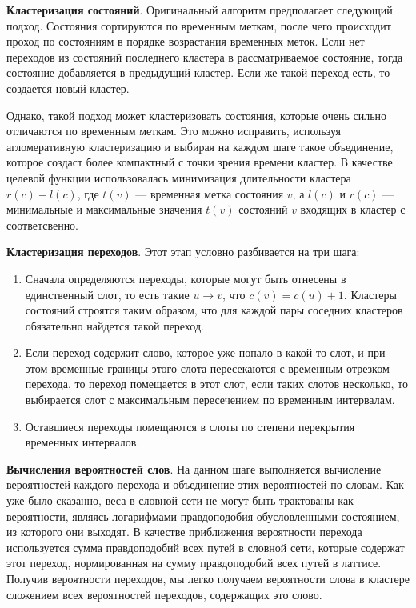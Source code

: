 \textbf{Кластеризация состояний}. Оригинальный алгоритм предполагает следующий подход. Состояния сортируются по временным меткам, после чего происходит проход по состояниям в порядке возрастания временных меток. Если нет переходов из состояний последнего кластера в рассматриваемое состояние, тогда состояние добавляется в предыдущий кластер. Если же такой переход есть, то создается новый кластер.

Однако, такой подход может кластеризовать состояния, которые очень сильно отличаются по временным меткам. Это можно исправить, используя агломеративную кластеризацию и выбирая на каждом шаге такое объединение, которое создаст более компактный с точки зрения времени кластер. В качестве целевой функции использовалась минимизация длительности кластера $r(c)-l(c)$, где $t(v)$ --- временная метка состояния $v$, а $l(c)$ и $r(c)$ --- минимальные и максимальные значения $t(v)$ состояний $v$ входящих в кластер $с$ соответсвенно.

\textbf{Кластеризация переходов}. Этот этап условно разбивается на три шага:

\begin{enumerate}
 \item Сначала определяются переходы, которые могут быть отнесены в единственный слот, то есть такие $u \rightarrow v$, что $ c(v)=c(u)+1$. Кластеры состояний строятся таким образом, что для каждой пары соседних кластеров обязательно найдется такой переход.
 \item Если переход содержит слово, которое уже попало в какой-то слот, и при этом временные границы этого слота пересекаются с временным отрезком перехода, то переход помещается в этот слот, если таких слотов несколько, то выбирается слот с максимальным пересечением по временным интервалам.
 \item Оставшиеся переходы помещаются в слоты по степени перекрытия временных интервалов.
\end{enumerate}

\textbf{Вычисления вероятностей слов}. На данном шаге выполняется вычисление вероятностей каждого перехода и объединение этих вероятностей по словам. Как уже было сказанно, веса в словной сети не могут быть трактованы как вероятности, являясь логарифмами правдоподобия обусловленными состоянием, из которого они выходят. В качестве приближения вероятности перехода используется сумма правдоподобий всех путей в словной сети, которые содержат этот переход, нормированная на сумму правдоподобий всех путей в латтисе. Получив вероятности переходов, мы легко получаем вероятности слова в кластере сложением всех вероятностей переходов, содержащих это слово.

